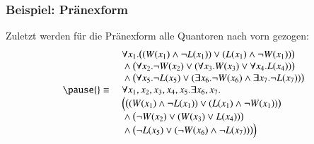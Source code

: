 \documentclass[onlymath]{beamer}
\begin{document}
\begin{frame}\frametitle{Beispiel: Pränexform}

Zuletzt werden für die Pränexform alle Quantoren nach vorn gezogen:
\[\begin{array}{rl}
& \forall x_1.\big((W(x_1)\wedge\neg L(x_1))\vee (L(x_1)\wedge\neg W(x_1))\big)\\
& {}\wedge{}  \big(\forall x_2.\neg W(x_2)\vee(\forall x_3.W(x_3) \vee \forall x_4.L(x_4))\big)\\
& {}\wedge{}  \big(\forall x_5.\neg L(x_5)\vee(\exists x_6.\neg W(x_6) \wedge \exists x_7.\neg L(x_7))\big)\\\pause
{}\equiv{} & \forall x_1,x_2,x_3,x_4,x_5.\exists x_6,x_7.\\
& \Big(\big((W(x_1)\wedge\neg L(x_1))\vee (L(x_1)\wedge\neg W(x_1))\big)\\
& {}\wedge{}  \big(\neg W(x_2)\vee(W(x_3) \vee L(x_4))\big)\\
& {}\wedge{}  \big(\neg L(x_5)\vee(\neg W(x_6) \wedge \neg L(x_7))\big)\Big)
\end{array}
\]


\end{frame}

\end{document}
